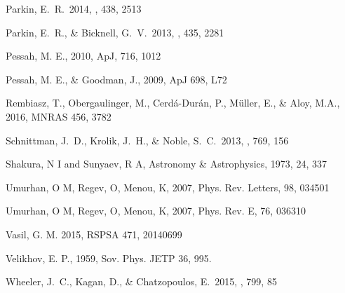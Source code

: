 \documentclass{emulateapj}
\begin{document}
\begin{thebibliography}{53}
 Parkin, E.~R.\ 2014, \mnras, 438, 2513 

 Parkin, E.~R., \& Bicknell, G.~V.\ 2013, \mnras, 435, 2281 

Pessah, M. E., 2010, ApJ, 716, 1012

Pessah, M. E., \& Goodman, J., 2009, ApJ 698, L72 

Rembiasz, T., Obergaulinger, M., Cerd\'a-Dur\'an, P., M\"uller, E., \& Aloy, M.A., 2016, MNRAS 456, 3782

 Schnittman, J.~D., Krolik, J.~H., \& Noble, S.~C.\ 2013, \apj, 769, 156 

Shakura, N I and Sunyaev, R A, Astronomy \& Astrophysics, 1973, 24, 337

Umurhan, O M, Regev, O, Menou, K, 2007, Phys. Rev. Letters, 98, 034501

Umurhan, O M, Regev, O, Menou, K, 2007, Phys. Rev. E, 76, 036310

Vasil, G. M. 2015, RSPSA 471, 20140699

Velikhov, E. P., 1959, Sov. Phys. JETP 36, 995.

 Wheeler, J.~C., Kagan, D., \& Chatzopoulos, E.\ 2015, \apj, 799, 85 

\end{thebibliography}
\end{document}
